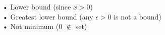 \documentclass[preview]{standalone}
\begin{document}
\begin{center}
• Lower bound (since $x > 0$)\\• Greatest lower bound (any $\epsilon > 0$ is not a bound)\\• Not minimum (0 $\notin$ set)
\end{center}
\end{document}

